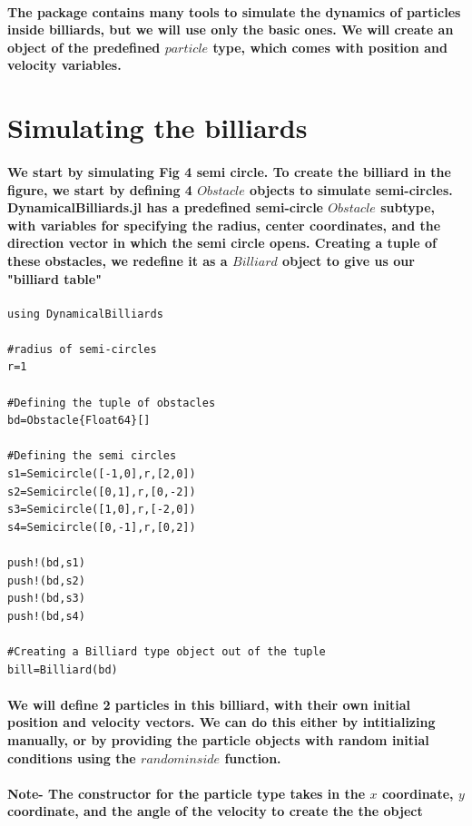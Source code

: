 \documentclass{report}
\begin{document}
\paragraph{The package contains many tools to simulate the dynamics of particles inside billiards, but we will use only the basic ones. We will create an object of the predefined $particle$ type, which comes with position and velocity variables.}


\section{Simulating the billiards}

\paragraph{We start by simulating Fig 4 semi circle. To create the billiard in the figure, we start by defining 4 $Obstacle$ objects to simulate semi-circles. DynamicalBilliards.jl has a predefined semi-circle $Obstacle$ subtype, with variables for specifying the radius, center coordinates, and the direction vector in which the semi circle opens. Creating a tuple of these obstacles, we redefine it as a $Billiard$ object to give us our "billiard table"  }

\begin{lstlisting}
using DynamicalBilliards

#radius of semi-circles
r=1 

#Defining the tuple of obstacles
bd=Obstacle{Float64}[]

#Defining the semi circles
s1=Semicircle([-1,0],r,[2,0])
s2=Semicircle([0,1],r,[0,-2])
s3=Semicircle([1,0],r,[-2,0])
s4=Semicircle([0,-1],r,[0,2])

push!(bd,s1)
push!(bd,s2)
push!(bd,s3)
push!(bd,s4)

#Creating a Billiard type object out of the tuple
bill=Billiard(bd)
\end{lstlisting}

\paragraph{We will define 2 particles in this billiard, with their own initial position and velocity vectors. We can do this either by intitializing manually, or by providing the particle objects with random initial conditions using the $randominside$ function.}

\paragraph{Note- The constructor for the particle type takes in the $x$ coordinate, $y$ coordinate, and the angle of the velocity to create the the object}
\end{document}

